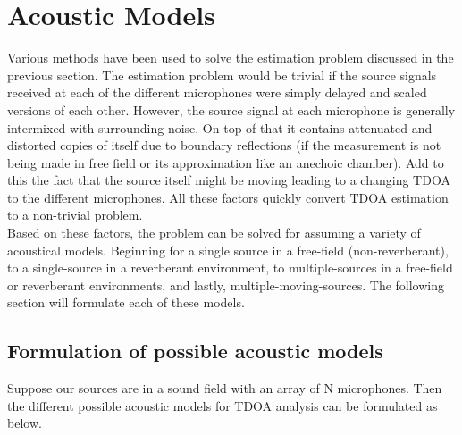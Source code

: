 \section{Acoustic Models}

Various methods have been used \cite{benesty2008microphone} to solve the estimation problem discussed in the previous section. The estimation problem would be trivial if the source signals received at each of the different microphones were simply delayed and scaled versions of each other. However, the source signal at each microphone is generally intermixed with surrounding noise. On top of that it contains attenuated and distorted copies of itself due to boundary reflections (if the measurement is not being made in free field or its approximation like an anechoic chamber). Add to this the fact that the source itself might be moving leading to a changing TDOA to the different microphones. All these factors quickly convert TDOA estimation to a non-trivial problem. \\
Based on these factors, the problem can be solved for assuming a variety of acoustical models. Beginning for a single source in a free-field (non-reverberant), to a single-source in a reverberant environment, to multiple-sources in a free-field or reverberant environments, and lastly, multiple-moving-sources. The following section will formulate each of these models.

\subsection{Formulation of possible acoustic models}
Suppose our sources are in a sound field with an array of N microphones. Then the different possible acoustic models for TDOA analysis can be formulated as below.

